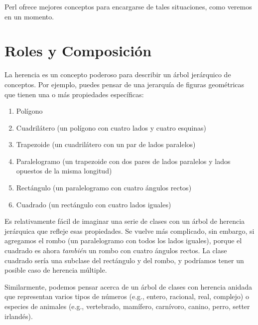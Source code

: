 Perl ofrece mejores conceptos para encargarse de tales situaciones, como
veremos en un momento.

\section{Roles y Composición}

La herencia es un concepto poderoso para describir un árbol jerárquico de
conceptos. Por ejemplo, puedes pensar de una jerarquía de figuras geométricas
que tienen una o más propiedades específicas: 
\begin{enumerate}
\item Polígono

\item Cuadrilátero (un polígono con cuatro lados y cuatro esquinas)

\item Trapezoide (un cuadrilátero con un par de lados paralelos)

\item Paralelogramo (un trapezoide con dos pares de lados paralelos y lados
opuestos de la misma longitud)

\item Rectángulo (un paralelogramo con cuatro ángulos rectos)

\item Cuadrado (un rectángulo con cuatro lados iguales)
\end{enumerate}

Es relativamente fácil de imaginar una serie de clases con un árbol de
herencia jerárquica que refleje esas propiedades. Se vuelve más 
complicado, sin embargo, si agregamos el rombo (un paralelogramo con
todos los lados iguales), porque el cuadrado es ahora \emph{también}
un rombo con cuatro ángulos rectos. La clase cuadrado sería una 
subclase del rectángulo y del rombo, y podríamos tener un posible
caso de herencia múltiple.

   
  
 
Similarmente, podemos pensar acerca de un árbol de clases con herencia
anidada que representan varios tipos de números (e.g., entero, 
racional, real, complejo) o especies de animales (e.g., vertebrado, 
mamífero, carnívoro, canino, perro, setter irlandés).

